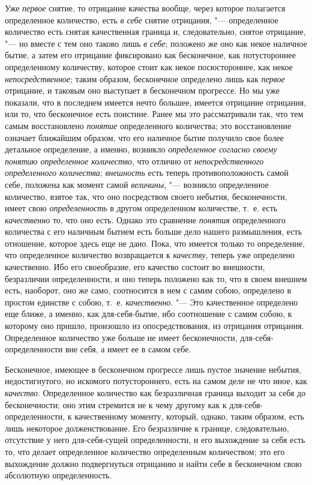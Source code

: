 Уже {\em первое} снятие, то отрицание качества вообще,
через которое полагается определенное количество, есть
{\em в себе} снятие отрицания, "--- определенное
количество есть снятая качественная граница и, следовательно, снятое
отрицание, "--- но вместе с тем оно таково лишь {\em в
себе}; положено же оно как некое наличное бытие, а затем его отрицание
фиксировано как бесконечное, как потустороннее определенному количеству,
которое стоит как некое посюстороннее, как некое
{\em непосредственное}; таким образом, бесконечное
определено лишь как {\em первое} отрицание, и таковым
оно выступает в бесконечном прогрессе. Но мы уже показали, что в последнем
имеется нечто большее, имеется отрицание отрицания, или то, что бесконечное
есть поистине. Ранее мы это рассматривали так, что тем самым восстановлено
{\em понятие} определенного количества; это
восстановление означает ближайшим образом, что его наличное бытие получило
свое более детальное определение, а именно, возникло
{\em определенное согласно своему понятию определенное
количество}, что отлично от {\em непосредственного
определенного количества}; {\em внешность} есть теперь
противоположность самой себе, положена как момент самой
{\em величины}, "--- возникло определенное количество,
взятое так, что оно посредством своего небытия, бесконечности, имеет свою
{\em определенность} в другом определенном
количестве, т.~е. есть {\em качественно} то, что оно
есть. Однако это сравнение {\em понятия} определенного
количества с его наличным бытием есть больше дело нашего размышления, есть
отношение, которое здесь еще не дано. Пока, что имеется только то
определение, что определенное количество возвращается к
{\em качеству}, теперь уже определено качественно. Ибо
его своеобразие, его качество состоит во внешности, безразличии
определенности, и оно теперь положено как то, что в своем внешнем есть,
наоборот, оно же само, соотносится в нем с самим собою, определено в
простом единстве с собою, т.~е. {\em качественно}. "---
Это качественное определено еще ближе, а именно, как для-себя-бытие, ибо
соотношение с самим собою, к которому оно пришло, произошло из
опосредствования, из отрицания отрицания. Определенное количество уже
больше не имеет бесконечности, для-себя-определенности вне себя, а имеет ее
в самом себе.

Бесконечное, имеющее в бесконечном прогрессе лишь пустое значение небытия,
недостигнутого, но искомого потустороннего, есть на самом деле не что иное,
как {\em качество}. Определенное количество как
безразличная граница выходит за себя до бесконечности; оно этим стремится
не к чему другому как к для-себя-определенности, к качественному моменту,
который, однако, таким образом, есть лишь некоторое долженствование. Его
безразличие к границе, следовательно, отсутствие у него для-себя-сущей
определенности, и его выхождение за себя есть то, что делает определенное
количество определенным количеством; это его выхождение должно
подвергнуться отрицанию и найти себе в бесконечном свою абсолютную
определенность.

